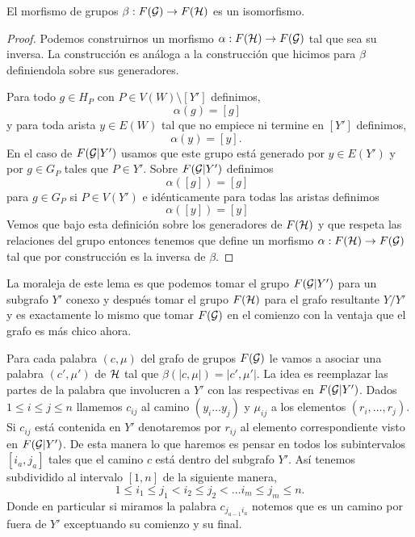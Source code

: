 \documentclass[tesis.tex]{subfiles}
\begin{document}
\begin{lema}\label{lema_reduc_isomorfismo_beta}
	El morfismo de grupos $\beta:F({\cal G}) \to F({\cal H})$ es un isomorfismo. 
\end{lema}
\begin{proof}
	Podemos construirnos un morfismo $\alpha:F({\cal H}) \to F({\cal G})$ tal que sea su inversa.
	La construcción es análoga a la construcción que hicimos para $\beta$ definiendola sobre sus generadores.
	
	Para todo $g \in H_P$ con $P \in V(W) \setminus [Y'] $ definimos,
	\begin{equation*}
		\alpha(g) = [g]  \ \ 
	\end{equation*}
	y para toda arista $ y \in E(W)$ tal que no empiece ni termine en $[Y']$ definimos,
	\begin{equation*}
		\alpha(y) = [y].  \ \ \ 
	\end{equation*}
	En el caso de $F({\cal G} | Y')$ usamos que este grupo está generado por $y \in E(Y')$ y por $g \in G_{P}$ tales que $P \in Y'$.
	Sobre $F({\cal G} | Y')$ definimos 
	\begin{equation*}
		\alpha([g]) = [g]  \ \ 
	\end{equation*}
	para $g \in G_P$ si $P \in V(Y')$ e idénticamente para todas las aristas definimos
	\begin{equation*}
		\alpha([y]) = [y]  \ \ 
	\end{equation*}
	Vemos que bajo esta definición sobre los generadores de $F({\cal H})$ y que respeta las relaciones del grupo entonces tenemos que define un morfismo $\alpha:F({\cal H}) \to F({\cal G})$ tal que por construcción es la inversa de $\beta$.
\end{proof}

La moraleja de este lema es que podemos tomar el grupo $F({\cal G} | Y')$ para un subgrafo $Y'$ conexo y después tomar el grupo $F({\cal H})$ para el grafo resultante $Y / Y'$ y es exactamente lo mismo que tomar $F({\cal G})$ en el comienzo con la ventaja que el grafo es más chico ahora.

Para cada palabra $(c, \mu)$ del grafo de grupos $F({\cal G})$ le vamos a asociar una palabra $(c', \mu')$ de ${\cal H}$ tal que $\beta (|c,\mu|) = |c',\mu'|$.
La idea es reemplazar las partes de la palabra que involucren a $Y'$ con las respectivas en $F({\cal G} | Y')$.
Dados $ 1 \le i \le j \le n$ llamemos $c_{ij}$ al camino 
$(y_i \dots y_{j})$ y $\mu_{ij}$ a los elementos $(r_i, \dots, r_j)$.
Si $c_{ij}$ está contenida en $Y'$ denotaremos por $r_{ij}$ al elemento correspondiente visto en $F({\cal G} | Y')$.
De esta manera lo que haremos es pensar en todos los subintervalos $[i_a,j_a]$  tales que el camino $c$ está dentro del subgrafo $Y'$.
Así tenemos subdividido al intervalo $[1,n]$ de la siguiente manera,
\[
	1\le i_1 \le j_1 < i_2 \le j_2 < \dots i_m \le j_m \le n.
\]
Donde en particular si miramos la palabra $c_{j_{a-1}i_a}$ notemos que es un camino por fuera de $Y'$ exceptuando su comienzo y su final.
\end{document}
